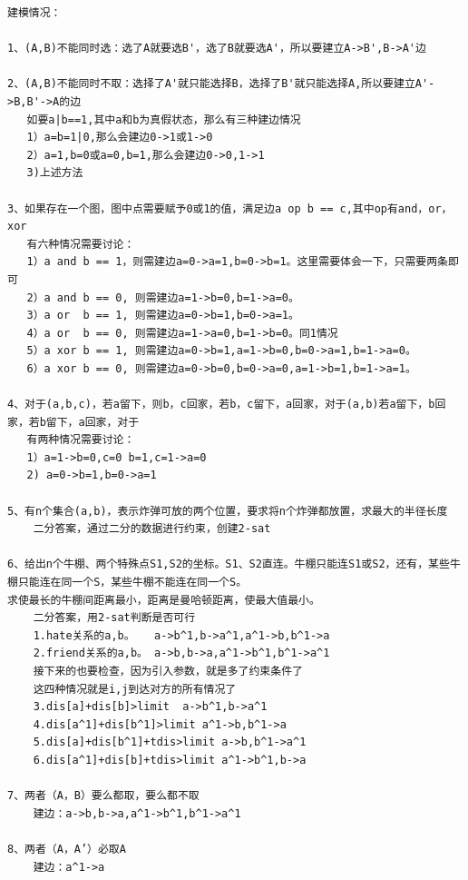 \documentclass[twoside]{article}
\begin{document}
\begin{lstlisting}
建模情况：

1、(A,B)不能同时选：选了A就要选B'，选了B就要选A'，所以要建立A->B',B->A'边

2、(A,B)不能同时不取：选择了A'就只能选择B，选择了B'就只能选择A,所以要建立A'->B,B'->A的边
   如要a|b==1,其中a和b为真假状态，那么有三种建边情况
   1）a=b=1|0,那么会建边0->1或1->0
   2）a=1,b=0或a=0,b=1,那么会建边0->0,1->1
   3)上述方法

3、如果存在一个图，图中点需要赋予0或1的值，满足边a op b == c,其中op有and，or，xor
   有六种情况需要讨论：
   1）a and b == 1，则需建边a=0->a=1,b=0->b=1。这里需要体会一下，只需要两条即可
   2）a and b == 0, 则需建边a=1->b=0,b=1->a=0。
   3）a or  b == 1, 则需建边a=0->b=1,b=0->a=1。
   4）a or  b == 0, 则需建边a=1->a=0,b=1->b=0。同1情况
   5）a xor b == 1, 则需建边a=0->b=1,a=1->b=0,b=0->a=1,b=1->a=0。
   6）a xor b == 0, 则需建边a=0->b=0,b=0->a=0,a=1->b=1,b=1->a=1。

4、对于(a,b,c)，若a留下，则b，c回家，若b，c留下，a回家，对于(a,b)若a留下，b回家，若b留下，a回家，对于
   有两种情况需要讨论：
   1）a=1->b=0,c=0 b=1,c=1->a=0
   2) a=0->b=1,b=0->a=1
   
5、有n个集合(a,b)，表示炸弹可放的两个位置，要求将n个炸弹都放置，求最大的半径长度
	二分答案，通过二分的数据进行约束，创建2-sat

6、给出n个牛棚、两个特殊点S1,S2的坐标。S1、S2直连。牛棚只能连S1或S2，还有，某些牛棚只能连在同一个S，某些牛棚不能连在同一个S。
求使最长的牛棚间距离最小，距离是曼哈顿距离，使最大值最小。
	二分答案，用2-sat判断是否可行
	1.hate关系的a,b。   a->b^1,b->a^1,a^1->b,b^1->a
	2.friend关系的a,b。 a->b,b->a,a^1->b^1,b^1->a^1
	接下来的也要检查，因为引入参数，就是多了约束条件了
	这四种情况就是i,j到达对方的所有情况了
	3.dis[a]+dis[b]>limit  a->b^1,b->a^1
	4.dis[a^1]+dis[b^1]>limit a^1->b,b^1->a
	5.dis[a]+dis[b^1]+tdis>limit a->b,b^1->a^1
	6.dis[a^1]+dis[b]+tdis>limit a^1->b^1,b->a

7、两者（A，B）要么都取，要么都不取
    建边：a->b,b->a,a^1->b^1,b^1->a^1

8、两者（A，A’）必取A
	建边：a^1->a
	



















\end{lstlisting}
\end{document}
